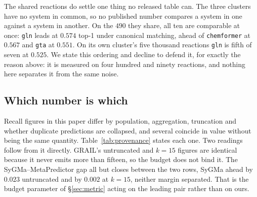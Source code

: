 The shared reactions do settle one thing no released table can. The three clusters have no system in
common, so no published number compares a system in one against a system in another. On the $490$
they share, all ten are comparable at once: \texttt{gln} leads at $0.574$ top-1 under canonical
matching, ahead of \texttt{chemformer} at $0.567$ and \texttt{gta} at $0.551$. On its own cluster's
five thousand reactions \texttt{gln} is fifth of seven at $0.525$. We state this ordering and
decline to defend it, for exactly the reason above: it is measured on four hundred and ninety
reactions, and nothing here separates it from the same noise.

\subsection{Which number is which}

Recall figures in this paper differ by population, aggregation, truncation and whether duplicate
predictions are collapsed, and several coincide in value without being the same quantity.
Table~\ref{tab:provenance} states each one. Two readings follow from it directly. GRAIL's untruncated and $k{=}15$ figures are identical because it never emits more than fifteen, so
the budget does not bind it. The SyGMa--MetaPredictor gap all but closes between the two
rows, SyGMa ahead by $0.023$ untruncated and by $0.002$ at $k{=}15$, neither margin separated. That
is the budget parameter of \S\ref{sec:metric} acting on the leading pair rather than on ours.

